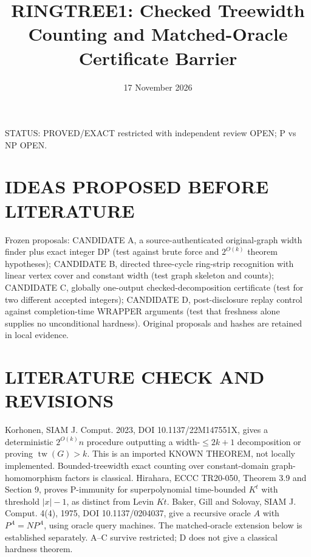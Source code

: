 \documentclass{article}
\title{RINGTREE1: Checked Treewidth Counting and Matched-Oracle Certificate Barrier}
\date{17 November 2026}
\begin{document}
\maketitle
\noindent STATUS: PROVED/EXACT restricted with independent review OPEN; P vs NP OPEN.

\section{IDEAS PROPOSED BEFORE LITERATURE}
Frozen proposals: CANDIDATE A, a source-authenticated original-graph width finder plus exact integer DP (test against brute force and $2^{O(k)}$ theorem hypotheses); CANDIDATE B, directed three-cycle ring-strip recognition with linear vertex cover and constant width (test graph skeleton and counts); CANDIDATE C, globally one-output checked-decomposition certificate (test for two different accepted integers); CANDIDATE D, post-disclosure replay control against completion-time WRAPPER arguments (test that freshness alone supplies no unconditional hardness). Original proposals and hashes are retained in local evidence.

\section{LITERATURE CHECK AND REVISIONS}
Korhonen, SIAM J. Comput. 2023, DOI 10.1137/22M147551X, gives a deterministic $2^{O(k)}n$ procedure outputting a width-$\le2k+1$ decomposition or proving $\operatorname{tw}(G)>k$. This is an imported KNOWN THEOREM, not locally implemented. Bounded-treewidth exact counting over constant-domain graph-homomorphism factors is classical. Hirahara, ECCC TR20-050, Theorem 3.9 and Section 9, proves P-immunity for superpolynomial time-bounded $K^t$ with threshold $|x|-1$, as distinct from Levin $Kt$. Baker, Gill and Solovay, SIAM J. Comput. 4(4), 1975, DOI 10.1137/0204037, give a recursive oracle $A$ with $P^A=NP^A$, using oracle query machines. The matched-oracle extension below is established separately. A--C survive restricted; D does not give a classical hardness theorem.
\end{document}
